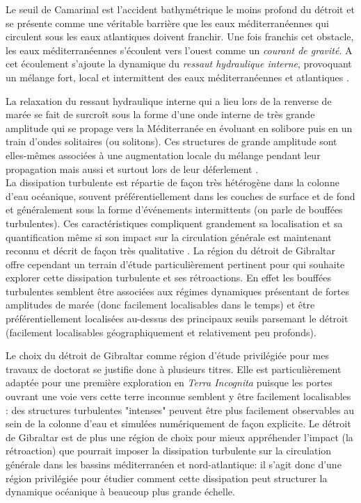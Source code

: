 Le seuil de Camarinal est l'accident bathymétrique le moins profond du détroit et se présente comme une véritable barrière que les eaux méditerranéennes qui circulent sous les eaux atlantiques doivent franchir. Une fois franchis cet obstacle, les eaux méditerranéennes s'écoulent vers l'ouest comme un \textit{courant de gravité}. A cet écoulement s'ajoute la dynamique du \textit{ressaut hydraulique interne}, provoquant un mélange fort, local et intermittent des eaux méditerranéennes et atlantiques \citep{wesson_1994,GarciaLafuente2011}.

La relaxation du ressaut hydraulique interne qui a lieu lors de la renverse de marée se fait de surcroît sous la forme d'une onde interne de très grande amplitude qui se propage vers la Méditerranée en évoluant en solibore puis en un train d'ondes solitaires (ou solitons). Ces structures de grande amplitude sont elles-mêmes associées à une augmentation locale du mélange pendant leur propagation mais aussi et surtout lors de leur déferlement \citep{vlasenko_2009}. \\

La dissipation turbulente est répartie de façon très hétérogène dans la colonne d'eau océanique, souvent préférentiellement dans les couches de surface et de fond et généralement sous la forme d'événements intermittents (on parle de bouffées turbulentes). Ces caractéristiques compliquent grandement sa localisation et sa quantification même si son impact sur la circulation générale est maintenant reconnu et décrit de façon très qualitative \citep{de_lavergne_abyssal_2017}. 
La région du détroit de Gibraltar offre cependant un terrain d'étude particulièrement pertinent pour qui souhaite explorer cette dissipation turbulente et ses rétroactions. En effet les bouffées turbulentes semblent être associées aux régimes dynamiques présentant de fortes amplitudes de marée (donc facilement localisables dans le temps) et être préférentiellement localisées au-dessus des principaux seuils parsemant le détroit (facilement localisables géographiquement et relativement peu profonds).

Le choix du détroit de Gibraltar comme région d'étude privilégiée pour mes travaux de doctorat se justifie donc à plusieurs titres. Elle est particulièrement adaptée pour une première exploration en \textit{Terra Incognita} puisque les portes ouvrant une voie vers cette terre inconnue semblent y être facilement localisables : des structures turbulentes "intenses" peuvent être plus facilement observables au sein de la colonne d'eau et simulées numériquement de façon explicite. Le détroit de Gibraltar est de plus une région de choix pour mieux appréhender l'impact (la rétroaction) que pourrait imposer la dissipation turbulente sur la circulation générale dans les bassins méditerranéen et nord-atlantique: il s'agit donc d'une région privilégiée pour étudier comment cette dissipation peut structurer la dynamique océanique à beaucoup plus grande échelle.


